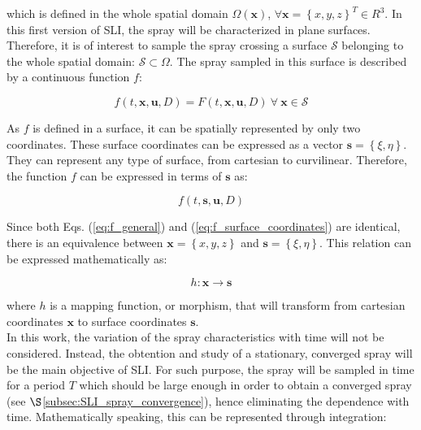 which is defined in the whole spatial domain $\Omega \left( \boldsymbol{x} \right)$, $\forall \boldsymbol{x} = \left\lbrace x, y, z \right\rbrace^T \in {R}^3$. In this first version of SLI, the spray will be characterized in plane surfaces. Therefore, it is of interest to sample the spray crossing a surface $\mathcal{S}$ belonging to the whole spatial domain: $\mathcal{S} \subset \Omega $. The spray sampled in this surface is described by a continuous function $f$:

\begin{equation}
\label{eq:f_general}
 f \left( t, \textbf{x}, \textbf{u}, D \right) = F \left( t, \textbf{x}, \textbf{u}, D \right) ~ \forall ~ \textbf{x} \in \mathcal{S}
\end{equation}

As $f$ is defined in a surface, it can be spatially represented by only two coordinates. These surface coordinates can be expressed as a vector $\boldsymbol{s} = \left\lbrace \xi, \eta \right\rbrace$. They can represent any type of surface, from cartesian to curvilinear. Therefore, the function $f$ can be expressed in terms of $\boldsymbol{s}$ as:

\begin{equation}
\label{eq:f_surface_coordinates}
f \left( t, \boldsymbol{s}, \textbf{u}, D \right)  
\end{equation}

Since both Eqs. (\ref{eq:f_general}) and (\ref{eq:f_surface_coordinates}) are identical, there is an equivalence between $\boldsymbol{x} = \left\lbrace x, y, z \right\rbrace$ and $\boldsymbol{s} = \left\lbrace \xi, \eta \right\rbrace$. This relation can be expressed mathematically as:

\begin{equation}
\label{eq:morphism_general_definition}
h : \boldsymbol{x} \rightarrow \boldsymbol{s}
\end{equation}


where $h$ is a mapping function, or morphism, that will transform from cartesian coordinates $\boldsymbol{x}$ to surface coordinates $\boldsymbol{s}$. \\


In this work, the variation of the spray characteristics with time will not be considered. Instead, the obtention and study of a stationary, converged spray will be the main objective of SLI. For such purpose, the spray will be sampled in time for a period $T$ which should be large enough in order to obtain a converged spray (see $\S$\ref{subsec:SLI_spray_convergence}), hence eliminating the dependence with time. Mathematically speaking, this can be represented through integration:

